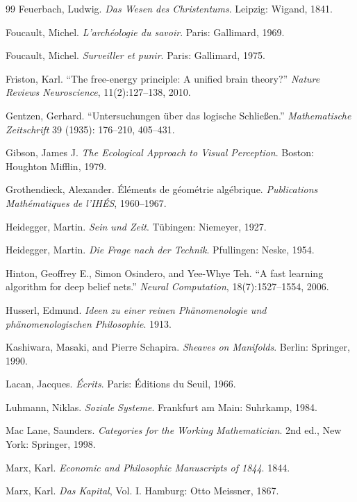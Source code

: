 \documentclass[11pt]{article}
\begin{document}
\begin{thebibliography}{99}
Feuerbach, Ludwig.
\textit{Das Wesen des Christentums}.
Leipzig: Wigand, 1841.

Foucault, Michel.
\textit{L’archéologie du savoir}.
Paris: Gallimard, 1969.

Foucault, Michel.
\textit{Surveiller et punir}.
Paris: Gallimard, 1975.

Friston, Karl.
“The free-energy principle: A unified brain theory?”
\textit{Nature Reviews Neuroscience}, 11(2):127–138, 2010.

Gentzen, Gerhard.
“Untersuchungen über das logische Schließen.”
\textit{Mathematische Zeitschrift} 39 (1935): 176–210, 405–431.

Gibson, James J.
\textit{The Ecological Approach to Visual Perception}.
Boston: Houghton Mifflin, 1979.

Grothendieck, Alexander.
Éléments de géométrie algébrique.
\textit{Publications Mathématiques de l'IHÉS}, 1960–1967.

Heidegger, Martin.
\textit{Sein und Zeit}.
Tübingen: Niemeyer, 1927.

Heidegger, Martin.
\textit{Die Frage nach der Technik}.
Pfullingen: Neske, 1954.

Hinton, Geoffrey E., Simon Osindero, and Yee-Whye Teh.
“A fast learning algorithm for deep belief nets.”
\textit{Neural Computation}, 18(7):1527–1554, 2006.

Husserl, Edmund.
\textit{Ideen zu einer reinen Phänomenologie und phänomenologischen Philosophie}.
1913.

Kashiwara, Masaki, and Pierre Schapira.
\textit{Sheaves on Manifolds}.
Berlin: Springer, 1990.

Lacan, Jacques.
\textit{Écrits}.
Paris: Éditions du Seuil, 1966.

Luhmann, Niklas.
\textit{Soziale Systeme}.
Frankfurt am Main: Suhrkamp, 1984.

Mac Lane, Saunders.
\textit{Categories for the Working Mathematician}.
2nd ed., New York: Springer, 1998.

Marx, Karl.
\textit{Economic and Philosophic Manuscripts of 1844}.
1844.

Marx, Karl.
\textit{Das Kapital}, Vol. I.
Hamburg: Otto Meissner, 1867.


\end{thebibliography}
\end{document}
